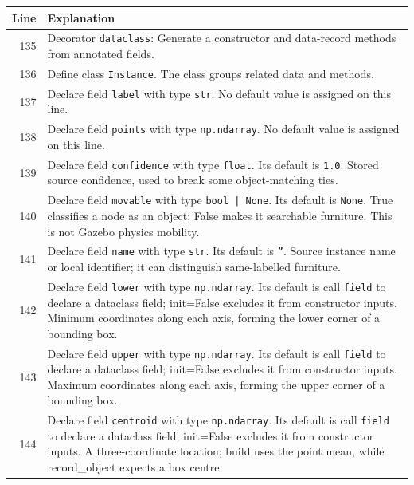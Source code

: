 \documentclass[11pt,a4paper]{book}
\begin{document}
\begin{longtable}{r p{}}

\textbf{Line} & \textbf{Explanation} \\ \hline \endhead

135 & Decorator \texttt{dataclass}: Generate a constructor and data-record methods from annotated fields. \\

136 & Define class \texttt{Instance}. The class groups related data and methods. \\

137 & Declare field \texttt{label} with type \texttt{str}. No default value is assigned on this line. \\

138 & Declare field \texttt{points} with type \texttt{np.ndarray}. No default value is assigned on this line. \\

139 & Declare field \texttt{confidence} with type \texttt{float}. Its default is \texttt{1.0}. Stored source confidence, used to break some object-matching ties. \\

140 & Declare field \texttt{movable} with type \texttt{bool | None}. Its default is \texttt{None}. True classifies a node as an object; False makes it searchable furniture. This is not Gazebo physics mobility. \\

141 & Declare field \texttt{name} with type \texttt{str}. Its default is \texttt{''}. Source instance name or local identifier; it can distinguish same-labelled furniture. \\

142 & Declare field \texttt{lower} with type \texttt{np.ndarray}. Its default is call \texttt{field} to declare a dataclass field; init=False excludes it from constructor inputs. Minimum coordinates along each axis, forming the lower corner of a bounding box. \\

143 & Declare field \texttt{upper} with type \texttt{np.ndarray}. Its default is call \texttt{field} to declare a dataclass field; init=False excludes it from constructor inputs. Maximum coordinates along each axis, forming the upper corner of a bounding box. \\

144 & Declare field \texttt{centroid} with type \texttt{np.ndarray}. Its default is call \texttt{field} to declare a dataclass field; init=False excludes it from constructor inputs. A three-coordinate location; build uses the point mean, while record\_object expects a box centre. \\


\end{longtable}
\end{document}
